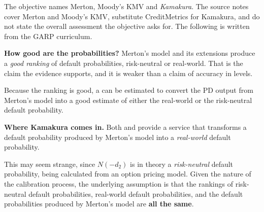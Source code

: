\gapbadge

{\footnotesize\color{FRMGrey}The objective names Merton, Moody's KMV and
\emph{Kamakura}. The source notes cover Merton and Moody's KMV, substitute
CreditMetrics for Kamakura, and do not state the overall assessment the objective
asks for. The following is written from the GARP curriculum.}

\begin{crgapbox}
\textbf{How good are the probabilities?} Merton's model and its extensions
produce a \emph{good ranking} of default probabilities, risk-neutral or
real-world. That is the claim the evidence supports, and it is weaker than a claim
of accuracy in levels.

\smallskip
Because the ranking is good, a  can be estimated
to convert the PD output from Merton's model into a good estimate of either the
real-world or the risk-neutral default probability.

\smallskip
\textbf{Where Kamakura comes in.} Both  and 
provide a service that transforms a default probability produced by Merton's
model into a \emph{real-world} default probability.

\smallskip
This may seem strange, since $N(-d_2)$ is in theory a \emph{risk-neutral} default
probability, being calculated from an option pricing model. Given the nature of
the calibration process, the underlying assumption is that the rankings of
risk-neutral default probabilities, real-world default probabilities, and the
default probabilities produced by Merton's model are \textbf{all the same}.
\end{crgapbox}
